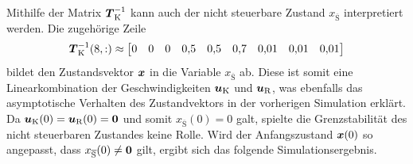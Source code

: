 Mithilfe der Matrix $\boldsymbol{T}^{-1}_{\text{K}}$ kann auch der nicht steuerbare Zustand $x_{\overline{\text{S}}}$ interpretiert werden. Die zugehörige Zeile
\begin{equation}
\boldsymbol{T}^{-1}_{\text{K}}(8,:) \approx \begin{bmatrix}
0 & 0 & 0 & 0{,}5 & 0{,}5 & 0{,}7 & 0{,}01 & 0{,}01 & 0{,}01
\end{bmatrix}
\end{equation}
bildet den Zustandsvektor $\boldsymbol{x}$ in die Variable $x_{\overline{\text{S}}}$ ab. Diese ist somit eine Linearkombination der Geschwindigkeiten $\boldsymbol{u}_{\text{K}}$ und $\boldsymbol{u}_{\text{R}}$, was ebenfalls das asymptotische Verhalten des Zustandvektors in der vorherigen Simulation erklärt. Da $\boldsymbol{u}_{\text{K}}(0)=\boldsymbol{u}_{\text{R}}(0)=\boldsymbol{0}$ und somit $x_{\overline{\text{S}}}(0)=0$ galt, spielte die Grenzstabilität des nicht steuerbaren Zustandes keine Rolle. Wird der Anfangszustand $\boldsymbol{x}(0)$ so angepasst, dass $x_{\overline{\text{S}}}(0)\neq \boldsymbol{0}$ gilt, ergibt sich das folgende Simulationsergebnis.
\clearpage
